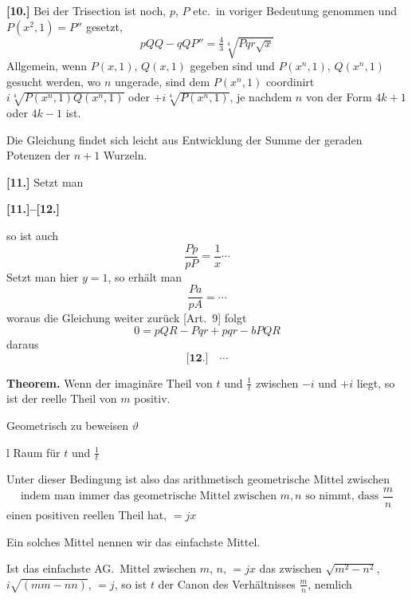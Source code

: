 \documentclass[10pt,a4paper]{article}
\begin{document}
\textbf{[10.]} Bei der Trisection ist noch, $p$, $P$ etc.\ in voriger Bedeutung genommen und $P(x^2, 1) = P''$ gesetzt,
%
\begin{equation*}
pQQ - qQP'' = \tfrac{4}{3}\sqrt[4]{Pqr\sqrt{x}}
\end{equation*}
%
Allgemein, wenn $P(x, 1)$, $Q(x, 1)$ gegeben sind und $P(x^n, 1)$, $Q(x^n, 1)$ gesucht werden, wo $n$ ungerade, sind dem $P(x^n, 1)$ coordinirt $i\sqrt[4]{P(x^n, 1)Q(x^n, 1)}$ oder $+i\sqrt[4]{P(x^n, 1)}$, je nachdem $n$ von der Form $4k + 1$ oder $4k - 1$ ist.

Die Gleichung findet sich leicht aus Entwicklung der Summe der geraden Potenzen der $n + 1$ Wurzeln.

\textbf{[11.]} Setzt man

\newpage
\textbf{[11.]--[12.]}

so ist auch
%
\begin{equation*}
\frac{Pp}{pP} = \frac{1}{x} \cdots
\end{equation*}
%
Setzt man hier $y = 1$, so erh\"alt man
%
\begin{equation*}
\frac{Pa}{pA} = \cdots
\end{equation*}
%
woraus die Gleichung weiter zur\"uck [Art.\ 9] folgt
%
\begin{equation*}
0 = pQR - Pqr + pqr - bPQR
\end{equation*}
%
daraus
%
\begin{equation*}
\textbf{[12.]} \quad \cdots
\end{equation*}

\textbf{Theorem.} Wenn der imagin\"are Theil von $t$ und $\frac{1}{t}$ zwischen $-i$ und $+i$ liegt, so ist der reelle Theil von $m$ positiv.

Geometrisch zu beweisen $\vartheta$

l Raum f\"ur $t$ und $\frac{1}{t}$

Unter dieser Bedingung ist also das arithmetisch geometrische Mittel zwischen
%
\begin{equation*}
\text{indem man immer das geometrische Mittel zwischen } m, n \text{ so nimmt, dass } \frac{m}{n}
\end{equation*}
%
einen positiven reellen Theil hat, $= jx$

Ein solches Mittel nennen wir das einfachste Mittel.

Ist das einfachste AG.\ Mittel zwischen $m$, $n$, $= jx$ das zwischen $\sqrt{m^2 - n^2}$, $i\sqrt{(mm - nn)}$, $= j$, so ist $t$ der Canon des Verh\"altnisses $\frac{m}{n}$, nemlich
\end{document}
